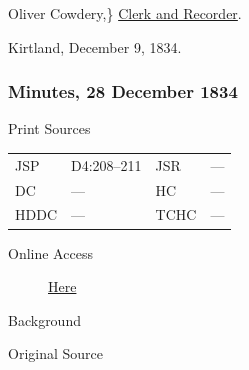					\begin{tightright}
					Oliver Cowdery,\} \uline{Clerk and Recorder}.
					\end{tightright}

					Kirtland, December 9, 1834.
					
		\subsubsection{Minutes, 28 December 1834}
			\label{EMS-1834-JS-28-DEC-1834}
			
			\begin{description}
					\item[Print Sources]
				\end{description}

					\begin{tabular}{p{0.5in}p{1in}p{0.5in}p{1in}}
					JSP	 	& D4:208--211		& JSR 		& --- \\
					DC	 	& --- 		& HC 		& --- \\
					HDDC 	& ---		& TCHC 		& --- \\
					\end{tabular}
				
				\begin{description}
					\item[Online Access] \href{https://www.josephsmithpapers.org/paper-summary/minutes-28-december-1834/1}{Here}
				\end{description}
				
				\begin{description}
					\item[Background]
				\end{description}
				
				
				\begin{description}
					\item[Original Source]
				\end{description}
				
